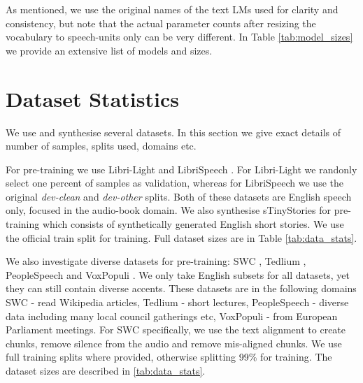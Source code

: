 As mentioned, we use the original names of the text LMs used for clarity and consistency, but note that the actual parameter counts after resizing the vocabulary to speech-units only can be very different. In Table \ref{tab:model_sizes} we provide an extensive list of models and sizes.

\section{Dataset Statistics}
We use and synthesise several datasets. In this section we give exact details of number of samples, splits used, domains etc. 

For pre-training we use Libri-Light \cite{ll} and LibriSpeech \cite{ls}. For Libri-Light we randonly select one percent of samples as validation, whereas for LibriSpeech we use the original \emph{dev-clean} and \emph{dev-other} splits. Both of these datasets are English speech only, focused in the audio-book domain. We also synthesise sTinyStories for pre-training which consists of synthetically generated English short stories. We use the official train split for training. Full dataset sizes are in Table \ref{tab:data_stats}.

We also investigate diverse datasets for pre-training: SWC \cite{swc}, Tedlium \cite{tedlium}, PeopleSpeech \cite{people} and VoxPopuli \cite{vp}. We only take English subsets for all datasets, yet they can still contain diverse accents. These datasets are in the following domains SWC - read Wikipedia articles, Tedlium - short lectures, PeopleSpeech - diverse data including many local council gatherings etc, VoxPopuli - from European Parliament meetings. For SWC specifically, we use the text alignment to create chunks, remove silence from the audio and remove mis-aligned chunks. We use full training splits where provided, otherwise splitting 99\% for training. The dataset sizes are described in \ref{tab:data_stats}.

\begin{table}[h]
  \caption{Dataset train set sizes that we use.}
  \centering
\end{table}

